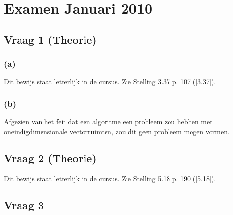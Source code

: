 \documentclass[lineaire_algebra_oplossingen.tex]{subfiles}
\begin{document}
\section{Examen Januari 2010}
\subsection{Vraag 1 (Theorie)}
\subsubsection*{(a)}
Dit bewijs staat letterlijk in de cursus. Zie Stelling 3.37 p. 107 (\ref{3.37}).

\subsubsection*{(b)}
Afgezien van het feit dat een algoritme een probleem zou hebben met oneindigdimensionale vectorruimten, zou dit geen probleem mogen vormen.

\subsection{Vraag 2 (Theorie)}
Dit bewijs staat letterlijk in de cursus. Zie Stelling 5.18 p. 190 (\ref{5.18}).

\subsection{Vraag 3}
\end{document}
